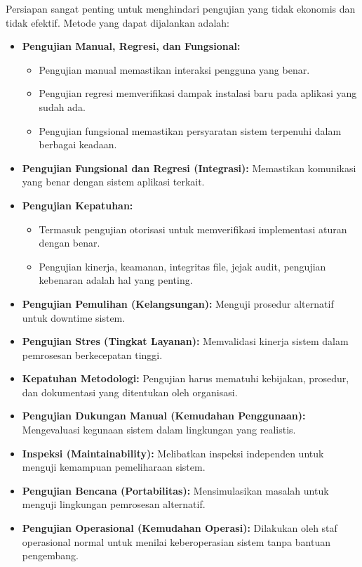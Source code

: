 \documentclass[12pt]{article}
\begin{document}
Persiapan sangat penting untuk menghindari pengujian yang tidak ekonomis dan tidak efektif. Metode yang dapat dijalankan adalah:
\begin{itemize}
   \item \textbf{Pengujian Manual, Regresi, dan Fungsional:}
         \begin{itemize}
            \item Pengujian manual memastikan interaksi pengguna yang benar.
            \item Pengujian regresi memverifikasi dampak instalasi baru pada aplikasi yang sudah ada.
            \item Pengujian fungsional memastikan persyaratan sistem terpenuhi dalam berbagai keadaan.
         \end{itemize}

   \item \textbf{Pengujian Fungsional dan Regresi (Integrasi):}        Memastikan komunikasi yang benar dengan sistem aplikasi terkait.


   \item \textbf{Pengujian Kepatuhan:}
         \begin{itemize}
            \item Termasuk pengujian otorisasi untuk memverifikasi implementasi aturan dengan benar.
            \item Pengujian kinerja, keamanan, integritas file, jejak audit, pengujian kebenaran adalah hal yang penting.
         \end{itemize}

   \item \textbf{Pengujian Pemulihan (Kelangsungan):}  Menguji prosedur alternatif untuk downtime sistem.
         

   \item \textbf{Pengujian Stres (Tingkat Layanan):} Memvalidasi kinerja sistem dalam pemrosesan berkecepatan tinggi.
      

   \item \textbf{Kepatuhan Metodologi:}         
          Pengujian harus mematuhi kebijakan, prosedur, dan dokumentasi yang ditentukan oleh organisasi.
         

   \item \textbf{Pengujian Dukungan Manual (Kemudahan Penggunaan):} Mengevaluasi kegunaan sistem dalam lingkungan yang realistis.
         

   \item \textbf{Inspeksi (Maintainability):}
          Melibatkan inspeksi independen untuk menguji kemampuan pemeliharaan sistem.
         

   \item \textbf{Pengujian Bencana (Portabilitas):}
          Mensimulasikan masalah untuk menguji lingkungan pemrosesan alternatif.
         

   \item \textbf{Pengujian Operasional (Kemudahan Operasi):}
          Dilakukan oleh staf operasional normal untuk menilai keberoperasian sistem tanpa bantuan pengembang.
         
\end{itemize}
\end{document}
